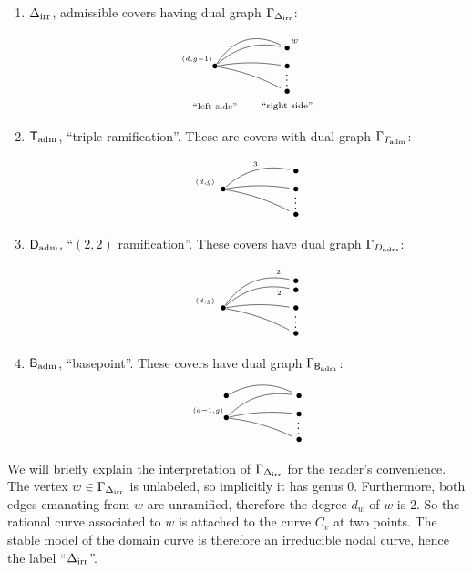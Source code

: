 \documentclass[reqno, 10 pt]{article}
\theoremstyle{definition}
\theoremstyle{remark}
\numberwithin{equation}{section}
\numberwithin{thm}{section}
\numberwithin{prop}{section}
\numberwithin{lem}{section}
\numberwithin{cor}{section}
\numberwithin{conj}{section}
\numberwithin{defn}{section}
\newcommand{\sfT}{{\mathsf T}}
\newcommand{\sfD}{{\mathsf D}}
\newcommand{\sfB}{{\mathsf B}}
\begin{document}
  \begin{enumerate}
  \item $\Delta_{\rm irr}$, admissible covers having dual graph $\Gamma_{\Delta_{\rm irr}}$:  

  \[  \xygraph{
  !{<0cm,0cm>;<1cm,0cm>:<0cm,1cm>::}
  !{(0,-.5)}*{\bullet}="l"!{(-.5,-.3)}{\scriptscriptstyle (d,g-1)}
  !{(2,0) }*+{\bullet}="n"!{(2.2,.2) }{\scriptstyle w}
  !{(2,-.5) }*+{\bullet}="a_1"
  !{(2,-1.2) }*+{\bullet}="a_{d-2}"
  !{(0,-1.6)}{\scriptstyle ``{\rm left\,\, side}"}
  !{(2,-1.6)}{\scriptstyle ``{\rm right\,\, side}"}
   "l"-@/^.3cm/"n" 
  "l"-@/^.5cm/"n"
  "l"-@/^.1cm/"a_1"
  "l"-@/^.1cm/"a_{d-2}"^(.95){\scriptscriptstyle \vdots}
  }  \]
  \item $\sfT_{\rm adm}$, ``triple ramification''.  These are covers with dual graph $\Gamma_{T_{\rm adm}} $:

  \[ \xygraph{
  !{<0cm,0cm>;<1cm,0cm>:<0cm,1cm>::}
  !{(0,-.5)}*{\bullet}="l"!{(-.5,-.3)}{\scriptscriptstyle (d,g)}
  !{(2,0) }*+{\bullet}="t"
  !{(2,-.5) }*+{\bullet}="a_1"
  !{(2,-1.2) }*+{\bullet}="a_{d-2}"
   "l"-@/^.3cm/"t"^{\scriptscriptstyle 3} 
  "l"-@/^.1cm/"a_1"
  "l"-@/^.1cm/"a_{d-2}"^(.95){\vdots}
  }  \]

  \item $\sfD_{\rm adm}$, ``$(2,2)$ ramification''. These covers have dual graph $\Gamma_{D_{\rm adm}}$:

  \[  \xygraph{
  !{<0cm,0cm>;<1cm,0cm>:<0cm,1cm>::}
  !{(0,-.5)}*{\bullet}="l"!{(-.5,-.3)}{\scriptscriptstyle (d,g)}
  !{(2,0) }*+{\bullet}="t_1"
  !{(2,.25) }*+{\bullet}="t_2"
  !{(2,-.5) }*+{\bullet}="a_1"
  !{(2,-1.2) }*+{\bullet}="a_{d-2}"
   "l"-@/^.3cm/"t_1"_(.8){\scriptscriptstyle 2} 
    "l"-@/^.4cm/"t_2"^(.8){\scriptscriptstyle 2} 
  "l"-@/^.1cm/"a_1"
  "l"-@/^.1cm/"a_{d-2}"^(.95){\vdots}
  }  \]
  \item ${\sfB}_{\rm adm}$, ``basepoint''. These covers have dual graph $\Gamma_{{\sfB}_{\rm adm}} $: 

  \[  \xygraph{
  !{<0cm,0cm>;<1cm,0cm>:<0cm,1cm>::}
  !{(0,-.6)}*{\bullet}="l"!{(-.5,-.4)}{\scriptscriptstyle (d-1,g)}
  !{(0,0)}*{\bullet}="l'"
  !{(2,0) }*+{\bullet}="b"
  !{(2,-.5) }*+{\bullet}="a_1"
  !{(2,-1.2) }*+{\bullet}="a_{d-2}"
   "l'"-@/^.3cm/"b" 
   "l"-@/^.3cm/"b" 
  "l"-@/^.1cm/"a_1"
  "l"-@/^.1cm/"a_{d-2}"^(.95){\vdots}
  }  \]
  \end{enumerate}


  We will briefly explain the interpretation of $\Gamma_{\Delta_{\rm irr}}$ for the reader's convenience. The vertex $w \in \Gamma_{\Delta_{\rm irr}}$ is unlabeled, so implicitly it has genus $0$.  Furthermore, both edges emanating from $w$ are unramified, therefore the degree $d_w$ of $w$ is $2$.  So the rational curve associated to $w$ is attached to the curve $C_v$ at two points.  The stable model of the domain curve is therefore an irreducible nodal curve, hence the label ``$\Delta_{\rm irr}$''.   
\end{document}
